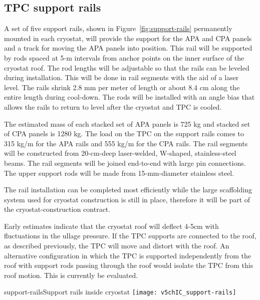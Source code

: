 \subsection{TPC support rails}
\label{fd:install:integ:rails}

A set of five support rails, shown in Figure~\ref{fig:support-rails} 
permanently mounted in each cryostat, will provide the support for the APA and CPA panels and a track for moving the APA panels into position.  
This rail will be supported by rods spaced at 5-m intervals from anchor points on the inner surface of the cryostat roof.  The rod lengths will be adjustable so that the rails can be leveled during installation.  This will be done in rail segments with the aid of a laser level.  The rails shrink 
2.8 mm per meter of length or about 8.4 cm along the entire length during cool-down.  The rods will be installed with an angle bias that allows the rails to return to level after the cryostat and TPC is cooled.

The estimated mass of each stacked set of APA panels is 725 kg and stacked set of CPA panels is 1280 kg.  The load on the TPC on the support rails comes to 315 kg/m for the APA rails and 555 kg/m 
for the CPA rails.  The rail segments will be constructed from 20-cm-deep laser-welded, W-shaped, stainless-steel beams.  The rail segments will be joined end-to-end with large pin connections.  The 
upper support rods will be made from 15-mm-diameter stainless steel.

The rail installation can be completed most efficiently while the large scaffolding system used for cryostat construction is still in place, therefore it will be part of the cryostat-construction contract.

Early estimates indicate that the cryostat roof will deflect 4-5cm with fluctuations in the ullage pressure.  If the TPC supports are connected to the roof, as described previously, the TPC will move and distort with 
the roof.  An alternative configuration in which the TPC is supported independently from the roof with support rods passing through the roof would isolate the TPC from this roof motion. This is currently be evaluated.


\begin{cdrfigure}{support-rails}{Support rails inside cryostat}
\texttt{[image: v5chIC\_support-rails]}
\end{cdrfigure}

